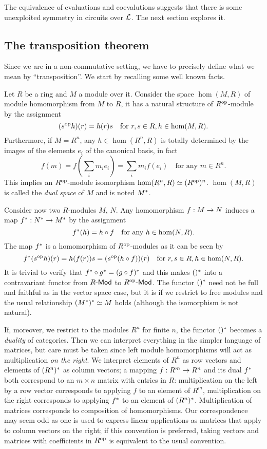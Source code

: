 The equivalence of evaluations and coevalutions suggests that there is
some unexploited symmetry in circuits over $\mathcal{L}$. The next
section explores it.


\subsection{The transposition theorem}
\label{sec:tellegen}

Since we are in a non-commutative setting, we have to precisely define
what we mean by ``transposition''. We start by recalling some well
known facts.

Let $R$ be a ring and $M$ a module over it. Consider the space
$\hom(M,R)$ of module homomorphism from $M$ to $R$, it has a natural
structure of $R^{\mathrm{op}}$-module by the assignment
\[(s^{\mathrm{op}}h)(r) = h(r)s \quad\text{for $r,s\in R, h\in\hom(M,R)$.}\]
Furthermore, if $M=R^n$, any $h\in\hom(R^n,R)$ is totally determined
by the images of the elements $e_i$ of the canonical basis, in fact
\[f(m) = f\left(\sum_im_ie_i\right) = \sum_im_if(e_i) \quad\text{for
  any $m\in R^n$.}\] This implies an $R^{\mathrm{op}}$-module isomorphism
$\hom(R^n,R)\simeq (R^{\mathrm{op}})^n$. $\hom(M,R)$ is called the \emph{dual
  space} of $M$ and is noted $M^\ast$.

Consider now two $R$-modules $M$, $N$. Any homomorphism $f:M\rightarrow N$
induces a map $f^\ast:N^\ast\rightarrow M^\ast$ by the assignment
\[f^\ast(h) = h\circ f \quad\text{for any $h\in\hom(N,R)$.}\]
The map $f^\ast$ is a homomorphism of $R^{\mathrm{op}}$-modules as it can be
seen by
\[f^\ast(s^{\mathrm{op}}h)(r) = h(f(r))s = (s^{\mathrm{op}}(h\circ f))(r)
\quad\text{for $r,s\in R,h\in\hom(N,R)$.}\] It is trivial to verify
that $f^\ast\circ g^\ast=(g\circ f)^\ast$ and this makes
$()^\ast$ into a contravariant functor from $R\text{\sf-Mod}$ to
$R^{\mathrm{op}}\text{\sf-Mod}$. The functor $()^\ast$ need not be full and
faithful as in the vector space case, but it is if we restrict to free
modules and the usual relationship $(M^\ast)^\ast\simeq M$ holds
(although the isomorphism is not natural).

If, moreover, we restrict to the modules $R^n$ for finite $n$, the
functor $()^\ast$ becomes a \emph{duality} of categories. Then we
can interpret everything in the simpler language of matrices, but care
must be taken since left module homomorphisms will act as
multiplication \emph{on the right}. We interpret elements of $R^n$ as
row vectors and elements of $(R^n)^\ast$ as column vectors; a
mapping $f:R^m\rightarrow R^n$ and its dual $f^\ast$ both correspond to an
$m\times n$ matrix with entries in $R$: multiplication on the left by
a row vector corresponds to applying $f$ to an element of $R^m$,
multiplication on the right corresponds to applying $f^\ast$ to an
element of $(R^n)^\ast$. Multiplication of matrices corresponds to
composition of homomorphisms. Our correspondence may seem odd as one
is used to express linear applications as matrices that apply to
column vectors on the right; if this convention is preferred, taking
vectors and matrices with coefficients in $R^{\mathrm{op}}$ is equivalent to the
usual convention.


